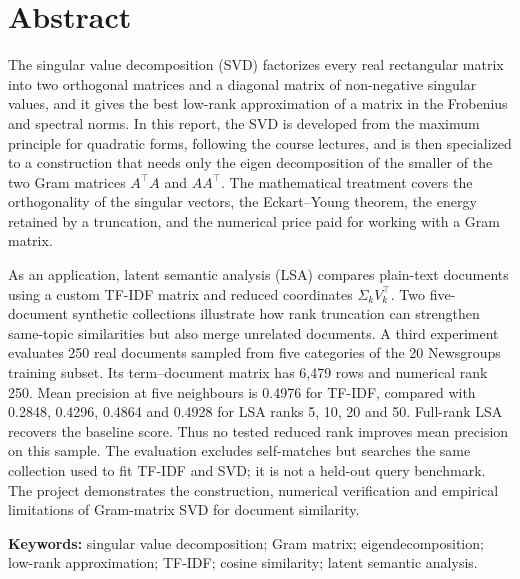 \documentclass[12pt,a4paper]{report}
\newcommand{\T}{^{\top}}
\theoremstyle{plain}
\theoremstyle{definition}
\theoremstyle{remark}
\theoremstyle{definition}
\begin{document}
\setcounter{page}{2}

\chapter*{Abstract}

The singular value decomposition (SVD) factorizes every real rectangular matrix into two orthogonal matrices and a diagonal matrix of non-negative singular values, and it gives the best low-rank approximation of a matrix in the Frobenius and spectral norms. In this report, the SVD is developed from the maximum principle for quadratic forms, following the course lectures, and is then specialized to a construction that needs only the eigen decomposition of the smaller of the two Gram matrices $A\T A$ and $AA\T$. The mathematical treatment covers the orthogonality of the singular vectors, the Eckart--Young theorem, the energy retained by a truncation, and the numerical price paid for working with a Gram matrix.

As an application, latent semantic analysis (LSA) compares plain-text documents using a custom TF-IDF matrix and reduced coordinates $\Sigma_kV_k\T$. Two five-document synthetic collections illustrate how rank truncation can strengthen same-topic similarities but also merge unrelated documents. A third experiment evaluates 250 real documents sampled from five categories of the 20 Newsgroups training subset. Its term--document matrix has 6,479 rows and numerical rank 250. Mean precision at five neighbours is 0.4976 for TF-IDF, compared with 0.2848, 0.4296, 0.4864 and 0.4928 for LSA ranks 5, 10, 20 and 50. Full-rank LSA recovers the baseline score. Thus no tested reduced rank improves mean precision on this sample. The evaluation excludes self-matches but searches the same collection used to fit TF-IDF and SVD; it is not a held-out query benchmark. The project demonstrates the construction, numerical verification and empirical limitations of Gram-matrix SVD for document similarity.

\bigskip
\noindent\textbf{Keywords:} singular value decomposition; Gram matrix; eigendecomposition; low-rank approximation; TF-IDF; cosine similarity; latent semantic analysis.
\end{document}
